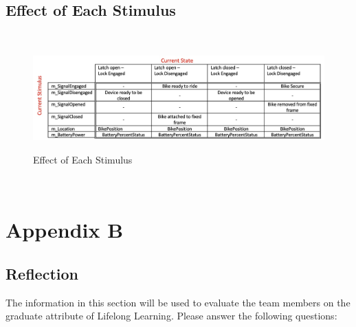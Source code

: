 \documentclass[12pt]{article}
\begin{document}
\subsection{Effect of Each Stimulus}
~\newline
\begin{figure}[h!]
 \begin{center}
 {
 \includegraphics[width=0.9\linewidth]{./EffectofEachStimulus.jpeg}
 }
 \caption{\label{Effect of Each Stimulus} Effect of Each Stimulus}
 \end{center}
 \end{figure}
~\newpage
\section{Appendix B}
\subsection{Reflection}

The information in this section will be used to evaluate the team members on the
graduate attribute of Lifelong Learning.  Please answer the following questions:
\end{document}
